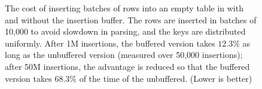 \begin{figure}
\begin{subfigure}{0.49\linewidth}
   \end{subfigure}
	\caption{The cost of inserting batches of rows into an empty
          table in \innodb{} with and without the insertion
          buffer. The rows are inserted in batches of 10,000 to avoid
          slowdown in parsing, and the keys are distributed
          uniformly. After 1M insertions, the buffered version takes
          $12.3\%$ as long as the unbuffered version (measured over
          50,000 insertions); after 50M insertions, the advantage is
          reduced so that the buffered version takes $68.3\%$ of
          the time of the unbuffered. (Lower is better)} \label{fig:introbuffer}
\end{figure}
